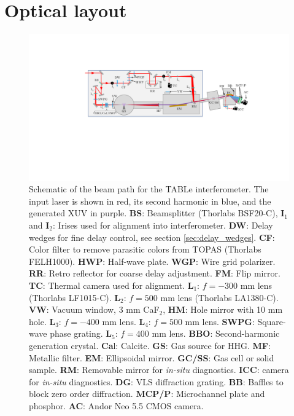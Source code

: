\section{Optical layout}
\label{sec:optical_layout}

\begin{figure}
	\centering
	\includegraphics[width=1.0\textwidth]{figures/Beamline/beampath_sketch_3.pdf}
	\caption[Schematic of TABLe optical layout.]{Schematic of the beam path for the TABLe interferometer. The input laser is shown in red, its second harmonic in  blue, and the generated XUV in purple.  \textbf{BS}: Beamsplitter (Thorlabs BSF20-C), \textbf{I$_1$} and \textbf{I$_2$}: Irises used for alignment into interferometer. \textbf{DW}: Delay wedges for fine delay control, see section \ref{sec:delay_wedges}. \textbf{CF}: Color filter to remove parasitic colors from TOPAS (Thorlabs FELH1000). \textbf{HWP}: Half-wave plate. \textbf{WGP}: Wire grid polarizer. \textbf{RR}: Retro reflector for coarse delay adjustment.  \textbf{FM}: Flip mirror. \textbf{TC}: Thermal camera used for alignment.  \textbf{L$_1$}: $f=-300$ mm lens (Thorlabs LF1015-C). \textbf{L$_2$}: $f=500$ mm lens (Thorlabs LA1380-C). \textbf{VW}: Vacuum window, 3 mm CaF$_2$, \textbf{HM}: Hole mirror with 10 mm hole.  \textbf{L$_3$}: $f=-400$ mm lens.  \textbf{L$_4$}: $f=500$ mm lens. \textbf{SWPG}: Square-wave phase grating. \textbf{L$_5$}: $f=400$ mm lens.  \textbf{BBO}: Second-harmonic generation crystal.  \textbf{Ca}l: Calcite. \textbf{GS}: Gas source for HHG. \textbf{MF}: Metallic filter. \textbf{EM}: Ellipsoidal mirror. \textbf{GC/SS}: Gas cell or solid sample. \textbf{RM}: Removable mirror for \textit{in-situ} diagnostics.    \textbf{ICC}: camera for \textit{in-situ} diagnostics. \textbf{DG}: VLS diffraction grating. \textbf{BB}: Baffles to block zero order diffraction.  \textbf{MCP/P}: Microchannel plate and phosphor.  \textbf{AC}: Andor Neo 5.5 CMOS camera.}
	\label{fig:beampath_sketch}
\end{figure}


